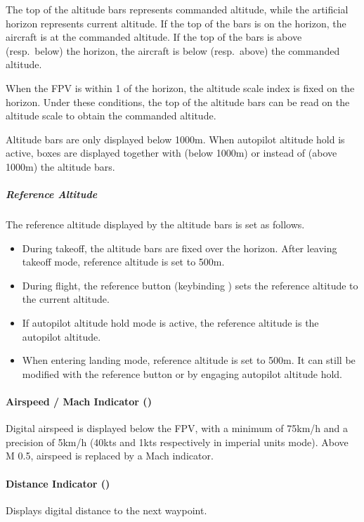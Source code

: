The top of the altitude bars represents commanded altitude,
while the artificial horizon represents current altitude.
If the top of the bars is on the horizon, the aircraft is at the commanded altitude.
If the top of the bars is above (resp.\ below) the horizon,
the aircraft is below (resp.\ above) the commanded altitude.

When the FPV is within 1\textdegree{} of the horizon,
the altitude scale index is fixed on the horizon.
Under these conditions, the top of the altitude bars
can be read on the altitude scale to obtain the commanded altitude.

Altitude bars are only displayed below 1000m.
When autopilot altitude hold is active, boxes are displayed together with
(below 1000m) or instead of (above 1000m) the altitude bars.

\subparagraph{Reference Altitude}
\label{sec:ref-alt}
The reference altitude displayed by the altitude bars is set as follows.
\begin{itemize}[noitemsep]
  \item During takeoff, the altitude bars are fixed over the horizon.
    After leaving takeoff mode, reference altitude is set to 500m.
  \item During flight, the reference button (keybinding )
    sets the reference altitude to the current altitude.
  \item If autopilot altitude hold mode is active,
    the reference altitude is the autopilot altitude.
  \item When entering landing mode, reference altitude is set to 500m.
    It can still be modified with the reference button or by engaging autopilot altitude hold.
\end{itemize}

\paragraph{Airspeed / Mach Indicator ()}
Digital airspeed is displayed below the FPV,
with a minimum of 75km/h and a precision of 5km/h
(40kts and 1kts respectively in imperial units mode).
Above M 0.5, airspeed is replaced by a Mach indicator.

\paragraph{Distance Indicator ()}
Displays digital distance to the next waypoint.

